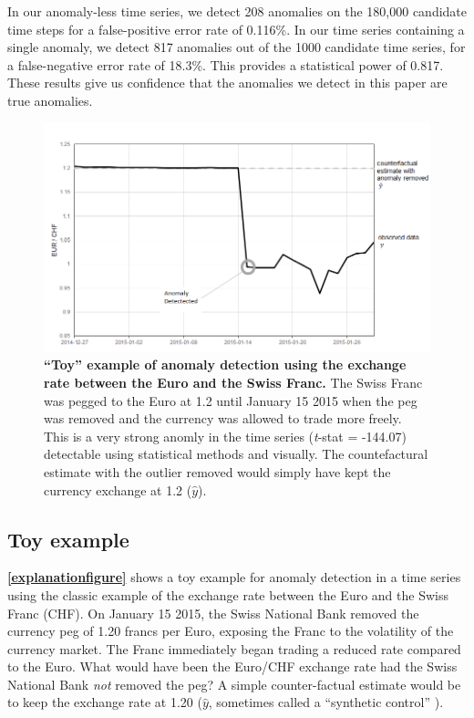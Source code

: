 \documentclass[12pt]{article}
\begin{document}
In our anomaly-less time series, we detect 208 anomalies on the 180,000
candidate time steps for a false-positive error rate of 0.116\%. In our
time series containing a single anomaly, we detect 817 anomalies out of
the 1000 candidate time series, for a false-negative error rate of
18.3\%. This provides a statistical power of 0.817. These results give
us confidence that the anomalies we detect in this paper are true
anomalies.

\begin{figure}
\centering
\includegraphics{../MainDocument/MainDocument_files/figure-latex/Figure1.png}
\caption{\textbf{``Toy'' example of anomaly detection using the exchange
rate between the Euro and the Swiss Franc.} The Swiss Franc was pegged
to the Euro at 1.2 until January 15 2015 when the peg was removed and
the currency was allowed to trade more freely. This is a very strong
anomly in the time series (\emph{t}-stat = -144.07) detectable using
statistical methods and visually. The countefactural estimate with the
outlier removed would simply have kept the currency exchange at 1.2
(\(\hat{y}\)). \label{explanationfigure}}
\end{figure}

\hypertarget{toy-example}{%
\subsection{Toy example}\label{toy-example}}

\textbf{\autoref{explanationfigure}} shows a toy example for anomaly
detection in a time series using the classic example of the exchange
rate between the Euro and the Swiss Franc (CHF). On January 15 2015, the
Swiss National Bank removed the currency peg of 1.20 francs per Euro,
exposing the Franc to the volatility of the currency market. The Franc
immediately began trading a reduced rate compared to the Euro. What
would have been the Euro/CHF exchange rate had the Swiss National Bank
\emph{not} removed the peg? A simple counter-factual estimate would be
to keep the exchange rate at 1.20 (\(\hat{y}\), sometimes called a
``synthetic control'' \citep{abadie2010synthetic}).
\end{document}
